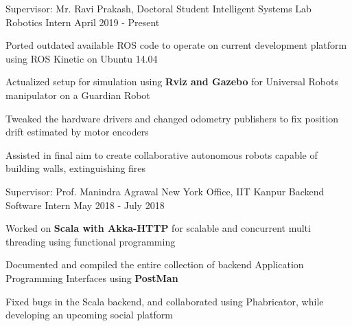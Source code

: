 \begin{cventries}

  \cventry
    {Supervisor: Mr. Ravi Prakash, Doctoral Student}
    {Intelligent Systems Lab}
    {Robotics Intern}
    {April 2019 - Present}
    {
      \begin{cvitems}
        \item{Ported outdated available ROS code to operate on current development platform using ROS Kinetic on Ubuntu 14.04}
        \item{Actualized setup for simulation using \textbf{Rviz and Gazebo} for Universal Robots manipulator on a Guardian Robot}
        \item{Tweaked the hardware drivers and changed odometry publishers to fix position drift estimated by motor encoders}
        \item{Assisted in final aim to create collaborative autonomous robots capable of building walls, extinguishing fires}
      \end{cvitems}
    }  

  \cventry
    {Supervisor: Prof. Manindra Agrawal}
    {New York Office, IIT Kanpur}
    {Backend Software Intern}
    {May 2018 - July 2018}
    {
      \begin{cvitems}
        \item{Worked on \textbf{Scala with Akka-HTTP} for scalable and concurrent multi threading using functional programming}
        \item{Documented and compiled the entire collection of backend Application Programming Interfaces using \textbf{PostMan}}
        \item{Fixed bugs in the Scala backend, and collaborated using Phabricator, while developing an upcoming social platform}
      \end{cvitems}
    }

\end{cventries}

